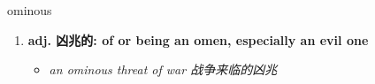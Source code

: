 
\begin{frame}
{\huge ominous}
\begin{center}
\begin{enumerate}\Large
  \item \textbf{adj. 凶兆的: of or being an omen, especially an evil one}
  \begin{itemize}
    \item \em{\Large{an ominous threat of war 战争来临的凶兆}}
  \end{itemize}
\end{enumerate}
\end{center}
\end{frame}
